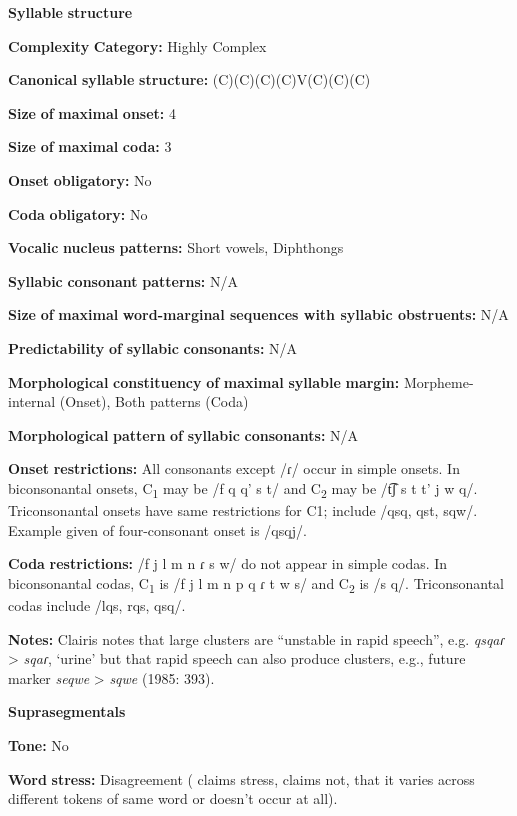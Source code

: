 \begin{styleBody}
\textbf{Syllable} \textbf{structure}

\textbf{Complexity} \textbf{Category:} Highly Complex

\textbf{Canonical} \textbf{syllable} \textbf{structure:} (C)(C)(C)(C)V(C)(C)(C) \citep[391-401]{Clairis1985}

\textbf{Size} \textbf{of} \textbf{maximal} \textbf{onset:} 4

\textbf{Size} \textbf{of} \textbf{maximal} \textbf{coda:} 3

\textbf{Onset} \textbf{obligatory:} No

\textbf{Coda} \textbf{obligatory:} No

\textbf{Vocalic} \textbf{nucleus} \textbf{patterns:} Short vowels, Diphthongs

\textbf{Syllabic} \textbf{consonant} \textbf{patterns:} N/A

\textbf{Size} \textbf{of} \textbf{maximal} \textbf{word{}-marginal sequences with syllabic obstruents:} N/A

\textbf{Predictability} \textbf{of} \textbf{syllabic} \textbf{consonants:} N/A 

\textbf{Morphological} \textbf{constituency} \textbf{of} \textbf{maximal} \textbf{syllable} \textbf{margin:} Morpheme-internal (Onset), Both patterns (Coda)

\textbf{Morphological} \textbf{pattern} \textbf{of} \textbf{syllabic} \textbf{consonants:} N/A

\textbf{Onset} \textbf{restrictions:} All consonants except /ɾ/ occur in simple onsets. In biconsonantal onsets, C\textsubscript{1} may be /f q q' s t/ and C\textsubscript{2} may be /t͡ʃ s t t' j w q/. Triconsonantal onsets have same restrictions for C1; include /qsq, qst, sqw/. Example given of four-consonant onset is /qsqj/.

\textbf{Coda} \textbf{restrictions:} /f j l m n ɾ s w/ do not appear in simple codas. In biconsonantal codas, C\textsubscript{1} is /f j l m n p q ɾ t w s/ and C\textsubscript{2} is /s q/. Triconsonantal codas include /lqs, rqs, qsq/.

\textbf{Notes:} Clairis notes that large clusters are “unstable in rapid speech”, e.g. \textit{qsqaɾ} > \textit{sqaɾ}, ‘urine’ but that rapid speech can also produce clusters, e.g., future marker \textit{seqwe} > \textit{sqwe} (1985: 393).

\textbf{Suprasegmentals}

\textbf{Tone:} No

\textbf{Word} \textbf{stress:} Disagreement (\citealt{Clairis1977} claims stress, \citealt{Clairis1985} claims not, that it varies across different tokens of same word or doesn’t occur at all).


\end{styleBody}
